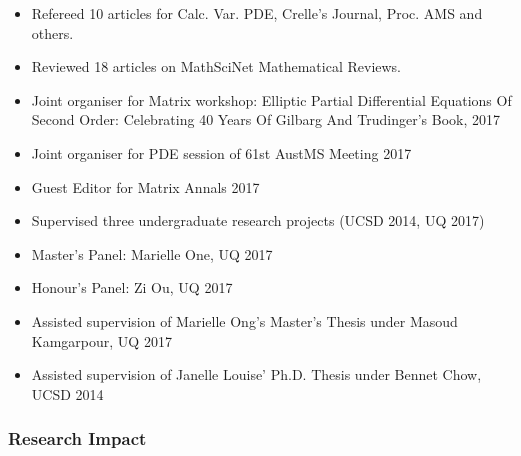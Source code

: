 \documentclass[12pt]{article}
\begin{document}
\begin{itemize}
\item Refereed 10 articles for Calc. Var. PDE, Crelle's Journal, Proc. AMS and others.
\item Reviewed 18 articles on MathSciNet Mathematical Reviews.
\item Joint organiser for Matrix workshop: Elliptic Partial Differential Equations Of Second Order: Celebrating 40 Years Of Gilbarg And Trudinger’s Book, 2017
\item Joint organiser for PDE session of 61st AustMS Meeting 2017
\item Guest Editor for Matrix Annals 2017
\item Supervised three undergraduate research projects (UCSD 2014, UQ 2017)
\item Master's Panel: Marielle One, UQ 2017
\item Honour's Panel: Zi Ou, UQ 2017
\item Assisted supervision of Marielle Ong's Master's Thesis under Masoud Kamgarpour, UQ 2017
\item Assisted supervision of Janelle Louise' Ph.D. Thesis under Bennet Chow, UCSD 2014
\end{itemize}

\subsubsection*{Research Impact}
\label{sec:orga7ffb65}
\end{document}
